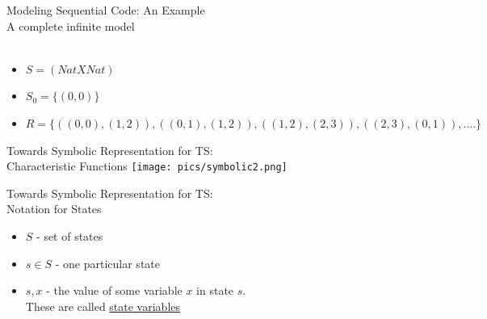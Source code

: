 \documentclass{beamer}
\begin{document}
\begin{frame}{Modeling Sequential Code: An Example \\
\small{A complete infinite model}}
\hfill
{} \\
 \\
\begin{itemize}
\item<3-> $S = (Nat X Nat)$
\item<3-> $S_0 = \{(0,0)\}$
\item<3-> $R = \{ ((0,0),(1,2)), ((0,1),(1,2)), ((1,2),(2,3)), ((2,3),(0,1)),....\}$ \\
\end{itemize}
\end{frame}

\begin{frame}{Towards Symbolic Representation for TS:\\Characteristic Functions}
\texttt{[image: pics/symbolic2.png]}
\end{frame}

\begin{frame}{Towards Symbolic Representation for TS:\\
Notation for States}
\begin{itemize}
\item $S$ - set of states

\item $s \in S$ - one particular state

\item $s,x$ - the value of some variable $x$ in state $s$. \\
These are called \underline{state variables}
\end{itemize}
\end{frame}
\end{document}
